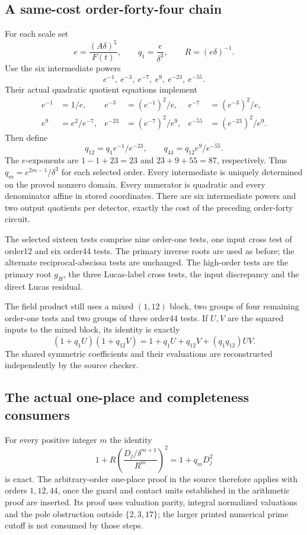 \subsection{A same-cost order-forty-four chain}

For each scale set
\[
 e=\frac{(A\delta)^5}{F(t)},\qquad
 q_1=\frac e{\delta^3},\qquad
 R=(e\delta)^{-1}.
\]
Use the six intermediate powers
\[
 e^{-1},\ e^{-3},\ e^{-7},\ e^9,\ e^{-23},\ e^{-55}.
\]
Their actual quadratic quotient equations implement
\begin{align*}
 e^{-1}&=1/e,&
 e^{-3}&=(e^{-1})^2/e,&
 e^{-7}&=(e^{-3})^2/e,\\
 e^9&=e^2/e^{-7},&
 e^{-23}&=(e^{-7})^2/e^9,&
 e^{-55}&=(e^{-23})^2/e^9.
\end{align*}
Then define
\[
 q_{12}=q_1e^{-1}/e^{-23},\qquad
 q_{44}=q_{12}e^9/e^{-55}.
\]
The $e$-exponents are $1-1+23=23$ and $23+9+55=87$, respectively.
Thus $q_m=e^{2m-1}/\delta^3$ for each selected order. Every intermediate
is uniquely determined on the proved nonzero domain. Every numerator is
quadratic and every denominator affine in stored coordinates. There are
six intermediate powers and two output quotients per detector, exactly
the cost of the preceding order-forty circuit.

The selected sixteen tests comprise nine order-one tests, one input
cross test of order12 and six order44 tests. The primary inverse roots
are used as before; the alternate reciprocal-abscissa tests are unchanged.
The high-order tests are the primary root $g_H$, the three Lucas-label
cross tests, the input discrepancy and the direct Lucas residual.

The field product still uses a mixed $(1,12)$ block, two groups of four
remaining order-one tests and two groups of three order44 tests. If $U,V$
are the squared inputs to the mixed block, its identity is exactly
\[
 (1+q_1U)(1+q_{12}V)
 =1+q_1U+q_{12}V+(q_1q_{12})UV.
\]
The shared symmetric coefficients and their evaluations are reconstructed
independently by the source checker.

\subsection{The actual one-place and completeness consumers}

For every positive integer $m$ the identity
\[
 1+R\left(\frac{D_j/\delta^{m+1}}{R^m}\right)^2
 =1+q_mD_j^2
\]
is exact. The arbitrary-order one-place proof in the source therefore
applies with orders $1,12,44$, once the guard and contact units established
in the arithmetic proof are inserted. Its proof uses valuation parity,
integral normalized valuations and the pole obstruction outside
$\{2,3,17\}$; the larger printed numerical prime cutoff is not consumed
by those steps.

